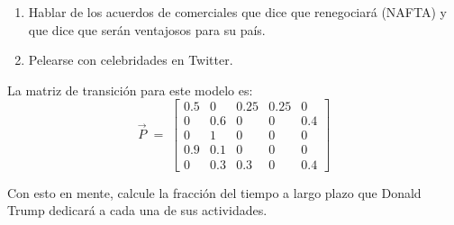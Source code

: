 \documentclass[ 10pt, xcolor = dvipsnames]{beamer}
\begin{document}
\begin{frame}[allowframebreaks]
\begin{enumerate}
\item Hablar de los acuerdos de comerciales que dice que renegociar\'a (\eg NAFTA) y que dice que ser\'an ventajosos para su pa\'is. 
\item Pelearse con celebridades en Twitter. 
\end{enumerate}
\fullskip

La matriz de transici\'on para este modelo es: 
\[
\vec{P} \; = \; 
\left[
\begin{array}{ccccc}
0.5 & 0 & 0.25 & 0.25 & 0 \\
0 & 0.6 & 0 & 0 & 0.4 \\
0 & 1 & 0 & 0 & 0 \\
0.9 & 0.1 & 0 & 0 & 0 \\
0 & 0.3 & 0.3 & 0 & 0.4
\end{array}
\right]
\]
\halfskip

Con esto en mente, calcule la fracci\'on del tiempo a largo plazo que Donald Trump dedicar\'a a cada una de sus actividades. 

\end{frame}
\end{document}
